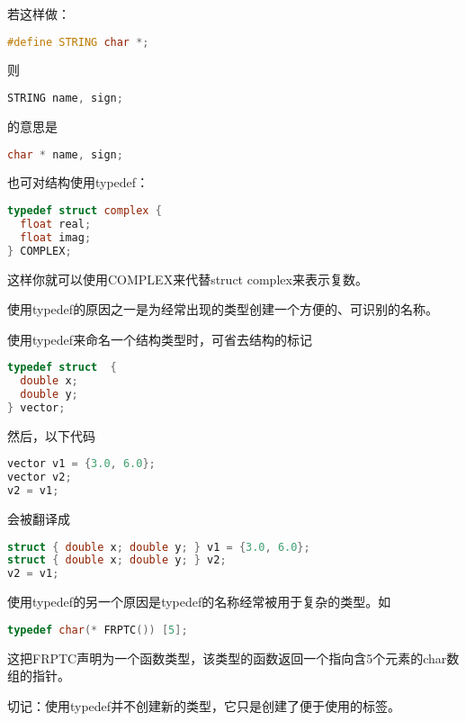 \begin{frame}[fragile]\ft{\secname}
若这样做：
  \begin{lstlisting}[language=c,backgroundcolor=\color{red!20}]
#define STRING char *;
  \end{lstlisting}
则
  \begin{lstlisting}[language=c,backgroundcolor=\color{red!20}]
STRING name, sign;
  \end{lstlisting}
的意思是
  \begin{lstlisting}[language=c,backgroundcolor=\color{red!20}]
char * name, sign;
  \end{lstlisting}
\end{frame}

\begin{frame}[fragile]\ft{\secname}
也可对结构使用{\tf typedef}：
  \begin{lstlisting}[language=c,backgroundcolor=\color{red!20}]
typedef struct complex {
  float real;
  float imag;
} COMPLEX;
  \end{lstlisting}
  这样你就可以使用{\tf COMPLEX}来代替{\tf struct complex}来表示复数。\vspace{0.1in}


  \textcolor{acolor1}{使用{\tf typedef}的原因之一是为经常出现的类型创建一个方便的、可识别的名称。}

\end{frame}

\begin{frame}[fragile]\ft{\secname}
使用{\tf typedef}来命名一个结构类型时，可省去结构的标记
  \begin{lstlisting}[language=c,backgroundcolor=\color{red!20}]
typedef struct  {
  double x;
  double y;
} vector;
  \end{lstlisting}
\end{frame}

\begin{frame}[fragile]\ft{\secname}
  然后，以下代码
  \begin{lstlisting}[language=c,backgroundcolor=\color{red!20}]
vector v1 = {3.0, 6.0};
vector v2;
v2 = v1;
  \end{lstlisting}
会被翻译成
  \begin{lstlisting}[language=c,backgroundcolor=\color{red!20}]
struct { double x; double y; } v1 = {3.0, 6.0};
struct { double x; double y; } v2;
v2 = v1;
  \end{lstlisting}
\end{frame}

\begin{frame}[fragile]\ft{\secname}
使用{\tf typedef}的另一个原因是{\tf typedef}的名称经常被用于复杂的类型。如
  \begin{lstlisting}[language=c,backgroundcolor=\color{red!20}]
typedef char(* FRPTC()) [5];
  \end{lstlisting}
这把{\tf FRPTC}声明为一个函数类型，该类型的函数返回一个指向含5个元素的{\tf char}数组的指针。
\end{frame}

\begin{frame}[fragile]\ft{\secname}
切记：\textcolor{acolor1}{使用{\tf typedef}并不创建新的类型，它只是创建了便于使用的标签。} 
\end{frame}
